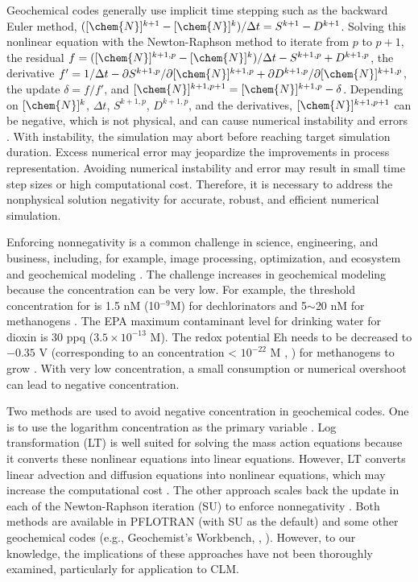 \documentclass[gmd, manuscript]{copernicus}
\begin{document}
Geochemical codes generally use implicit time stepping such as the backward
Euler method, $([\chem{N}]^{k+1} - [\chem{N}]^k)/\Delta t = S^{k+1} - D^{k+1}$.
Solving this nonlinear equation with the Newton-Raphson method to iterate from
$p$ to $p+1$, the residual $f = ([\chem{N}]^{k+1,p}-[\chem{N}]^k)/{\Delta t} -
S^{k+1,p} + D^{k+1,p}$, the derivative $f'={1}/{\Delta t}  - {\partial
S^{k+1,p}}/{\partial [\chem{N}]^{k+1,p}} + {\partial D^{k+1,p}}/{\partial
[\chem{N}]^{k+1,p}}$, the update $\delta = f/f'$, and $[\chem{N}]^{k+1,p+1} =
[\chem{N}]^{k+1,p} - \delta$.  
Depending on $[\chem{N}]^k$, $\Delta t$, $S^{k+1,p}$, $D^{k+1,p}$, and the
derivatives, $[\chem{N}]^{k+1,p+1}$ can be negative, which is not physical, and
can cause numerical instability and errors \citep{Shampine2005}. With
instability, the simulation may abort before reaching target
simulation duration. Excess numerical error may jeopardize the improvements in
process representation. Avoiding numerical instability and error may result in
small time step sizes or high computational cost. Therefore, it is necessary to
address the nonphysical solution negativity for accurate, robust, and efficient numerical
simulation.  

Enforcing nonnegativity is a common challenge in science, engineering, and
business, including, for example, image processing, optimization, and ecosystem
and geochemical modeling
\citep{Antonelli2009,Broekhuizen2008,Bruggeman2007,Burchard2003,Burchard2005,Chen2009,Pierre2000,Shampine2005}.
The challenge increases in geochemical modeling because the concentration can
be very low. For example, the threshold concentration for  is 1.5
\unit{nM} (10$^{-9}$\unit{M}) for dechlorinators and 5$\sim$20 \unit{nM} for
methanogens \citep{Fennell1998}.  The EPA maximum contaminant level for
drinking water for dioxin is 30 \unit{ppq} ($3.5\times 10^{-13}$ \unit{M}). The
redox potential Eh needs to be decreased to $-0.35$ \unit{V} (corresponding to an
 concentration < $10^{-22}$ \unit{M} \citeauthor{Hungate1975},
\citeyear{Hungate1975}) for methanogens to grow \citep{Jarrell1985}. With very
low concentration, a small consumption or numerical overshoot can lead to
negative concentration.  

Two methods are used to avoid negative concentration in geochemical codes. One
is to use the logarithm concentration as the primary variable
\citep{Bethke2007,Hammond2003,Parkhurst1999}.  Log transformation (LT) is well
suited for solving the mass action equations because it converts these nonlinear
equations into linear equations. However, LT converts linear advection and
diffusion equations into nonlinear equations, which may increase the
computational cost \citep{Hammond2003}. The other approach scales back the
update in each of the Newton-Raphson iteration (SU) to enforce nonnegativity
\citep{Bethke2007,Hammond2003}. Both methods are available in PFLOTRAN \citep{Lichtner2015} (with SU as the default) and
some other geochemical codes (e.g., Geochemist's Workbench,
\citeauthor{Bethke2007}, \citeyear{Bethke2007}). However, to our knowledge, the
implications of these approaches have not been thoroughly examined,
particularly for application to CLM. 
\end{document}
